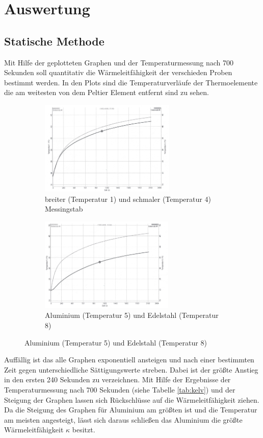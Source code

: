 \section{Auswertung}
\label{sec:Auswertung}
\subsection{Statische Methode}

Mit Hilfe der geplotteten Graphen und der Temperaturmessung nach 700 Sekunden soll quantitativ die Wärmeleitfähigkeit der verschieden Proben bestimmt werden. In den Plots sind die Temperaturverläufe der Thermoelemente die am weitesten von dem Peltier Element entfernt sind zu sehen.
\begin{figure}
	\caption{Temperaturverlauf}
	\centering
	\begin{subfigure}{0.48\textwidth}
		\centering
  		\includegraphics[height=4.5cm]{./Graph_4.png}
  		\caption{breiter (Temperatur 1) und schmaler (Temperatur 4) Messingstab}
		\label{fig:T1T4}
	\end{subfigure}
	\begin{subfigure}{0.48\textwidth}
  		\centering
  		\includegraphics[height=4.5cm]{./Graph_5.png}
  		\caption{Aluminium (Temperatur 5) und Edelstahl (Temperatur 8)}
		\label{fig:T5T8}
	\end{subfigure}
\end{figure}
Auffällig ist das alle Graphen exponentiell ansteigen und nach einer bestimmten Zeit gegen unterschiedliche Sättigungswerte streben. Dabei ist der größte Anstieg in den ersten 240 Sekunden zu verzeichnen. Mit Hilfe der Ergebnisse der Temperaturmessung nach 700 Sekunden (siehe Tabelle \ref{tab:kelv}) und der Steigung der Graphen lassen sich Rückschlüsse auf die Wärmeleitfähigkeit ziehen. Da die Steigung des Graphen für Aluminium am größten ist und die Temperatur am meisten angesteigt, lässt sich daraus schließen das Aluminium die größte Wärmeleitfähigkeit $\kappa$ besitzt.
